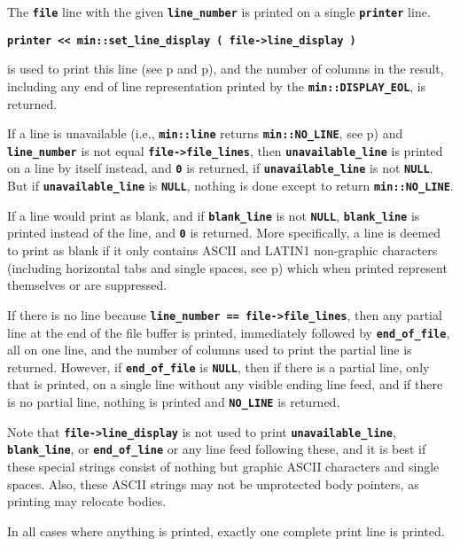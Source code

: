 \documentclass[12pt]{article}
\newcommand{\TT}[1]{{\tt \bfseries #1}}
\newcommand{\pagref}[1]{p\pageref{#1}}
\newcommand{\EOL}{\penalty \exhyphenpenalty}
\begin{document}
The \TT{file} line with the given \TT{line\_number}
is printed on a single \TT{printer} line.
\begin{center}
\TT{printer <{}< min::set\_line\_display ( file->line\_display )}
\end{center}
is used to print this line
(see \pagref{FILE_LINE_DISPLAY} and \pagref{MIN::SET_LINE_DISPLAY}),
and the number of columns in the result,
including any end of line representation printed by the
\TT{min::\EOL DISPLAY\_\EOL EOL}, is returned.

If a line is
unavailable (i.e., \TT{min::\EOL line} returns \TT{min::\EOL NO\_\EOL LINE},
see \pagref{MIN::LINE_OF_FILE})
and \TT{line\_\EOL number} is not equal \TT{file->\EOL file\_\EOL lines},
then \TT{unavailable\_\EOL line} is printed on a line by itself instead, and
\TT{0} is returned, if \TT{unavailable\_\EOL line} is not \TT{NULL}.
But if \TT{unavailable\_\EOL line} is \TT{NULL}, nothing is done except
to return \TT{min::\EOL NO\_\EOL LINE}.

If a line would print as blank, and if
\TT{blank\_\EOL line} is not \TT{NULL},
\TT{blank\_\EOL line} is printed instead of the line, and \TT{0} is returned.
More specifically, a line is deemed to print as blank if it only contains
ASCII and LATIN1 non-graphic characters (including horizontal tabs and
single spaces, see \pagref{MIN::IS_GRAPHIC})
which when printed represent themselves or are suppressed.

If there is no line
because \TT{line\_\EOL number == file->\EOL file\_\EOL lines},
then any partial line at the end of the file buffer is printed,
immediately followed by \TT{end\_\EOL of\_\EOL file}, all on one line,
and the number of columns used to print the partial line is returned.
However, if \TT{end\_\EOL of\_\EOL file} is \TT{NULL}, then
if there is a partial line, only that is printed, on a single line
without any visible ending line feed, and if there is no partial line,
nothing is printed and \TT{NO\_\EOL LINE} is returned.

Note that
\TT{file->\EOL line\_\EOL display} is not used to print
\TT{unavailable\_\EOL line}, \TT{blank\_\EOL line}, or
\TT{end\_\EOL of\_\EOL line} or any line feed following these,
and it is best if these special strings consist of nothing but
graphic ASCII characters and single spaces.
Also, these ASCII strings may not be unprotected body pointers,
as printing may relocate bodies.

In all cases where anything is printed, exactly one complete print line is
printed.
\end{document}

